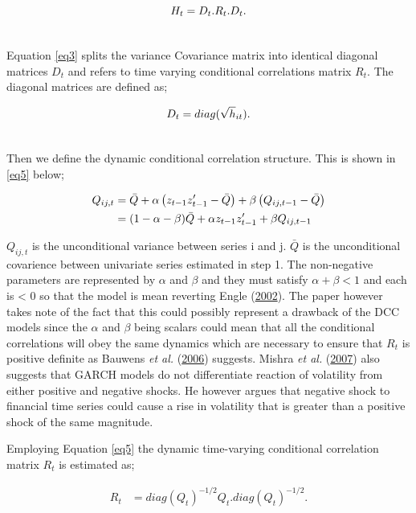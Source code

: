 \documentclass[11pt,preprint, authoryear]{elsarticle}
\numberwithin{equation}{section}
\numberwithin{figure}{section}
\numberwithin{table}{section}
\begin{document}
\begin{align} 
H_t = D_t.R_t.D_t. \label{eq3} \\ \notag
\end{align}

Equation \ref{eq3} splits the variance Covariance matrix into identical
diagonal matrices \(D_t\) and refers to time varying conditional
correlations matrix \(R_t\). The diagonal matrices are defined as;

\begin{align} 
D_t = diag(\sqrt h_{it}). \label {eq4} \\ \notag
 \end{align}

Then we define the dynamic conditional correlation structure. This is
shown in \ref{eq5} below;

\begin{align}  \label {eq5}
Q_{ij,t} &= \bar Q + \alpha\left(z_{t - 1}z'_{t - 1} - \bar{Q} \right) + \beta\left( Q_{ij, t - 1} - \bar{Q} \right) \hfill \\ \notag  &= (1 - \alpha - \beta)\bar{Q} + \alpha z_{t - 1}z'_{t - 1} + \beta Q_{ij, t - 1} \notag
\end{align}

\(Q_{ij,t}\) is the unconditional variance between series i and j.
\(\bar{Q}\) is the unconditional covarience between univariate series
estimated in step 1. The non-negative parameters are represented by
\(\alpha\) and \(\beta\) and they must satisfy \(\alpha + \beta < 1\)
and each is \textless{} 0 so that the model is mean reverting Engle
(\protect\hyperlink{ref-engle2002}{2002}). The paper however takes note
of the fact that this could possibly represent a drawback of the DCC
models since the \(\alpha\) and \(\beta\) being scalars could mean that
all the conditional correlations will obey the same dynamics which are
necessary to ensure that \(R_t\) is positive definite as Bauwens
\emph{et al.} (\protect\hyperlink{ref-bauwens2006}{2006}) suggests.
Mishra \emph{et al.} (\protect\hyperlink{ref-mishra2007}{2007}) also
suggests that GARCH models do not differentiate reaction of volatility
from either positive and negative shocks. He however argues that
negative shock to financial time series could cause a rise in volatility
that is greater than a positive shock of the same magnitude.

Employing Equation \ref{eq5} the dynamic time-varying conditional
correlation matrix \(R_t\) is estimated as;

\begin{align}   \label{eq6}
R_t &= diag(Q_t)^{-1/2}Q_t.diag(Q_t)^{-1/2}. 
\end{align}
\end{document}
